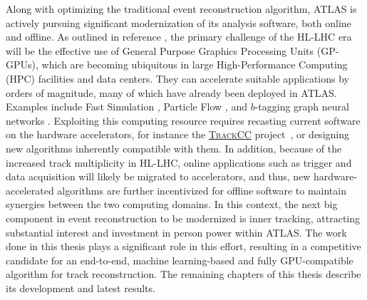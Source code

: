 Along with optimizing the traditional event reconstruction algorithm, ATLAS is actively pursuing significant modernization of its analysis software, both online and offline. 
As outlined in reference \cite{CERN-LHCC-2022-005}, the primary challenge of the HL-LHC era will be the effective use of General Purpose Graphics Processing Units (GP-GPUs), which are becoming ubiquitous in large High-Performance Computing (HPC) facilities and data centers.  
They can accelerate suitable applications by orders of magnitude, many of which have already been deployed in ATLAS. 
Examples include Fast Simulation \cite{atlfast}, Particle Flow \cite{particle-flow}, and $b$-tagging graph neural networks \cite{GN1}.
Exploiting this computing resource requires recasting current software on the hardware accelerators, for instance the \hyperlink{https://github.com/acts-project/traccc}{\textsc{TrackCC}} project~\cite{andreas_salzburger_2025_15260074}, or designing new algorithms inherently compatible with them.
In addition, because of the increased track multiplicity in HL-LHC, online applications such as trigger and data acquisition will likely be migrated to accelerators, and thus, new hardware-accelerated algorithms are further incentivized for offline software to maintain synergies between the two computing domains.
In this context, the next big component in event reconstruction to be modernized is inner tracking, attracting substantial interest and investment in person power within ATLAS.
The work done in this thesis plays a significant role in this effort, resulting in a competitive candidate for an end-to-end, machine learning-based and fully GPU-compatible algorithm for track reconstruction. 
The remaining chapters of this thesis describe its development and latest results.






